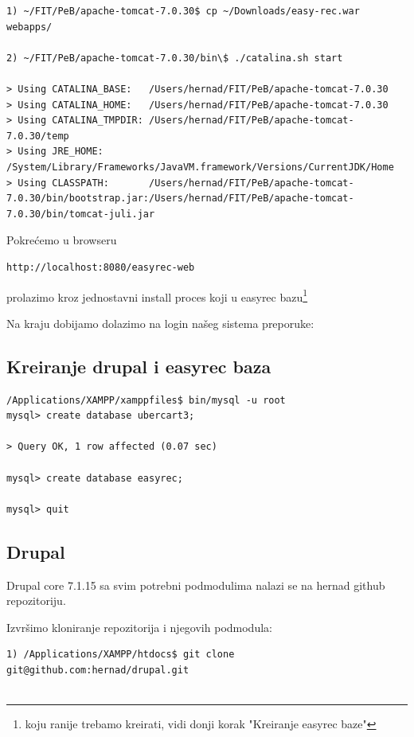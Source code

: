 \documentclass[times, utf8, seminar]{fit}
\begin{document}
{{{\begin{lstlisting}
1) ~/FIT/PeB/apache-tomcat-7.0.30$ cp ~/Downloads/easy-rec.war webapps/

2) ~/FIT/PeB/apache-tomcat-7.0.30/bin\$ ./catalina.sh start

> Using CATALINA_BASE:   /Users/hernad/FIT/PeB/apache-tomcat-7.0.30
> Using CATALINA_HOME:   /Users/hernad/FIT/PeB/apache-tomcat-7.0.30
> Using CATALINA_TMPDIR: /Users/hernad/FIT/PeB/apache-tomcat-7.0.30/temp
> Using JRE_HOME:        /System/Library/Frameworks/JavaVM.framework/Versions/CurrentJDK/Home
> Using CLASSPATH:       /Users/hernad/FIT/PeB/apache-tomcat-7.0.30/bin/bootstrap.jar:/Users/hernad/FIT/PeB/apache-tomcat-7.0.30/bin/tomcat-juli.jar
\end{lstlisting}

Pokrećemo u browseru 

\begin{lstlisting}
http://localhost:8080/easyrec-web
\end{lstlisting}

prolazimo kroz jednostavni install proces koji u easyrec bazu\footnote{koju ranije trebamo kreirati, vidi donji korak "Kreiranje easyrec baze"} 

Na kraju dobijamo dolazimo na login našeg sistema preporuke:

\subsection{Kreiranje drupal i easyrec baza}

\begin{lstlisting}
/Applications/XAMPP/xamppfiles$ bin/mysql -u root
mysql> create database ubercart3;

> Query OK, 1 row affected (0.07 sec)

mysql> create database easyrec;

mysql> quit

\end{lstlisting}

\subsection{Drupal}

Drupal core 7.1.15 sa svim potrebni podmodulima nalazi se na hernad github repozitoriju. 

Izvršimo kloniranje repozitorija i njegovih podmodula:

\begin{lstlisting}
1) /Applications/XAMPP/htdocs$ git clone git@github.com:hernad/drupal.git


\end{lstlisting}}}}
\end{document}
